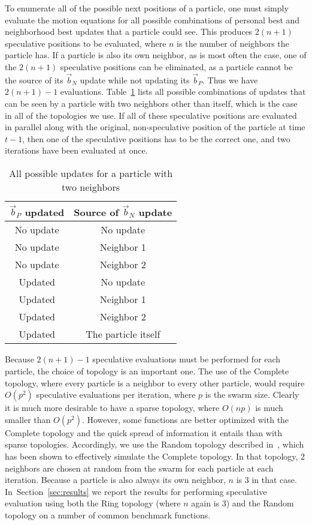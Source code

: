\documentclass[journal,letterpaper]{IEEEtran}
\renewcommand{\sec}[1]{Section~\ref{sec:#1}}
\providecommand{\nbest}{\ensuremath{\Vec{b}_N}}
\providecommand{\pbest}{\ensuremath{\Vec{b}_P}}
\begin{document}
To enumerate all of the possible next positions of a particle, one must simply
evaluate the motion equations for all possible combinations of personal best
and neighborhood best updates that a particle could see.  This produces
$2(n+1)$ speculative positions to be evaluated, where $n$ is the number of
neighbors the particle has.  If a particle is also its own neighbor, as is most
often the case, one of the $2(n+1)$ speculative positions can be eliminated, as
a particle cannot be the source of its $\nbest$ update while not updating its
$\pbest$.  Thus we have $2(n+1)-1$ evaluations.  Table~\ref{tab:evals} lists
all possible combinations of updates that can be seen by a particle with two
neighbors other than itself, which is the case in all of the topologies we use.
If all of these speculative positions are evaluated in parallel along with the
original, non-speculative position of the particle at time $t-1$, then one of
the speculative positions has to be the correct one, and two iterations have
been evaluated at once.

\begin{table}
  \caption{All possible updates for a particle with two neighbors}
  \label{tab:evals}
  \centering
  \begin{tabular}{cc}
	$\pbest$ updated&Source of $\nbest$ update\\
	\hline
	\hline
	No update&No update\\
	\hline
	No update&Neighbor 1\\
	\hline
	No update&Neighbor 2\\
	\hline
	Updated&No update\\
	\hline
	Updated&Neighbor 1\\
	\hline
	Updated&Neighbor 2\\
	\hline
	Updated&The particle itself\\
	\hline
  \end{tabular}
\end{table}

Because $2(n+1)-1$ speculative evaluations must be performed for each particle,
the choice of topology is an important one.  The use of the Complete topology,
where every particle is a neighbor to every other particle, would require
$O(p^2)$ speculative evaluations per iteration, where $p$ is the swarm size.
Clearly it is much more desirable to have a sparse topology, where $O(np)$ is
much smaller than $O(p^2)$.  However, some functions are better optimized with
the Complete topology and the quick spread of information it entails than with
sparse topologies.  Accordingly, we use the Random topology described
in~\cite{mcnabb-cec09}, which has been shown to effectively simulate the
Complete topology.  In that topology, 2 neighbors are chosen at random from the
swarm for each particle at each iteration.  Because a particle is also always
its own neighbor, $n$ is $3$ in that case.  In~\sec{results} we report the
results for performing speculative evaluation using both the Ring topology
(where $n$ again is $3$) and the Random topology on a number of common
benchmark functions.
\end{document}
